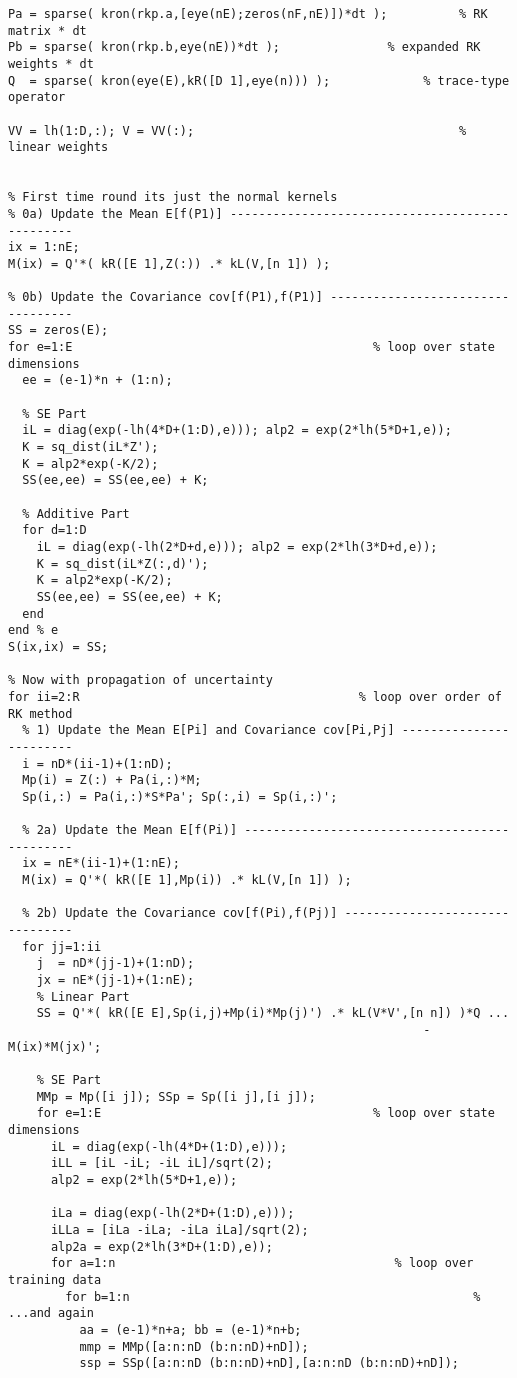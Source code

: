 \begin{lstlisting}
Pa = sparse( kron(rkp.a,[eye(nE);zeros(nF,nE)])*dt );          % RK matrix * dt
Pb = sparse( kron(rkp.b,eye(nE))*dt );               % expanded RK weights * dt
Q  = sparse( kron(eye(E),kR([D 1],eye(n))) );             % trace-type operator

VV = lh(1:D,:); V = VV(:);                                     % linear weights


% First time round its just the normal kernels
% 0a) Update the Mean E[f(P1)] ------------------------------------------------
ix = 1:nE;
M(ix) = Q'*( kR([E 1],Z(:)) .* kL(V,[n 1]) );

% 0b) Update the Covariance cov[f(P1),f(P1)] ----------------------------------
SS = zeros(E);
for e=1:E                                          % loop over state dimensions
  ee = (e-1)*n + (1:n);
  
  % SE Part
  iL = diag(exp(-lh(4*D+(1:D),e))); alp2 = exp(2*lh(5*D+1,e)); 
  K = sq_dist(iL*Z');
  K = alp2*exp(-K/2);
  SS(ee,ee) = SS(ee,ee) + K;
  
  % Additive Part
  for d=1:D 
    iL = diag(exp(-lh(2*D+d,e))); alp2 = exp(2*lh(3*D+d,e));
    K = sq_dist(iL*Z(:,d)');
    K = alp2*exp(-K/2);
    SS(ee,ee) = SS(ee,ee) + K;
  end
end % e
S(ix,ix) = SS;

% Now with propagation of uncertainty
for ii=2:R                                       % loop over order of RK method
  % 1) Update the Mean E[Pi] and Covariance cov[Pi,Pj] ------------------------
  i = nD*(ii-1)+(1:nD);
  Mp(i) = Z(:) + Pa(i,:)*M;
  Sp(i,:) = Pa(i,:)*S*Pa'; Sp(:,i) = Sp(i,:)';
  
  % 2a) Update the Mean E[f(Pi)] ----------------------------------------------
  ix = nE*(ii-1)+(1:nE);
  M(ix) = Q'*( kR([E 1],Mp(i)) .* kL(V,[n 1]) );
  
  % 2b) Update the Covariance cov[f(Pi),f(Pj)] --------------------------------
  for jj=1:ii
    j  = nD*(jj-1)+(1:nD);
    jx = nE*(jj-1)+(1:nE);
    % Linear Part
    SS = Q'*( kR([E E],Sp(i,j)+Mp(i)*Mp(j)') .* kL(V*V',[n n]) )*Q ...
                                                          - M(ix)*M(jx)';
    
    % SE Part
    MMp = Mp([i j]); SSp = Sp([i j],[i j]);
    for e=1:E                                      % loop over state dimensions
      iL = diag(exp(-lh(4*D+(1:D),e)));
      iLL = [iL -iL; -iL iL]/sqrt(2);
      alp2 = exp(2*lh(5*D+1,e));
      
      iLa = diag(exp(-lh(2*D+(1:D),e)));
      iLLa = [iLa -iLa; -iLa iLa]/sqrt(2);
      alp2a = exp(2*lh(3*D+(1:D),e));
      for a=1:n                                       % loop over training data
        for b=1:n                                                % ...and again
          aa = (e-1)*n+a; bb = (e-1)*n+b;
          mmp = MMp([a:n:nD (b:n:nD)+nD]);
          ssp = SSp([a:n:nD (b:n:nD)+nD],[a:n:nD (b:n:nD)+nD]);
          

\end{lstlisting}
